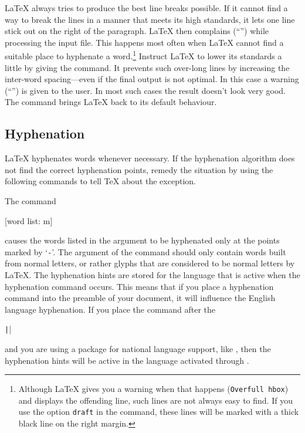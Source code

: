 \LaTeX{} always tries to produce the best line breaks possible. If it
cannot find a way to break the lines in a manner that meets its high
standards, it lets one line stick out on the right of the paragraph.
\LaTeX{} then complains (\enquote{}) while processing the
input file. This happens most often when \LaTeX{} cannot find a
suitable place to hyphenate a word.\footnote{Although \LaTeX{} gives
  you a warning when that happens (\texttt{Overfull \bs{}hbox}) and displays the
  offending line, such lines are not always easy to find. If you use
  the option \texttt{draft} in the  command, these
  lines will be marked with a thick black line on the right margin.}
Instruct \LaTeX{} to lower its standards a little by giving
the  command. It prevents such over-long lines by
increasing the inter-word spacing---even if the final output is not
optimal.  In this case a warning (``'') is given to
the user.  In most such cases the result doesn't look very good. The
command  brings \LaTeX{} back to its default behaviour.

\subsection{Hyphenation}\label{hyph}

\LaTeX{} hyphenates words whenever necessary. If the hyphenation
algorithm does not find the correct hyphenation points,
remedy the situation by using the following commands to tell \TeX{}
about the exception.

The command
\begin{lscommand}
  [word list: m]
\end{lscommand}
causes the words listed in the argument to be hyphenated only at the points
marked by \enquote*{\texttt{-}}.  The argument of the command should only contain
words built from normal letters, or rather glyphs that are considered to be
normal letters by \LaTeX{}. The hyphenation hints are stored for the language
that is active when the hyphenation command occurs. This means that if you
place a hyphenation command into the preamble of your document, it will
influence the English language hyphenation. If you place the command after the
\begin{chktexignore}
  \texttt||
\end{chktexignore}
and you are using a package for national language
support, like , then the hyphenation hints will be active in
the language activated through .

